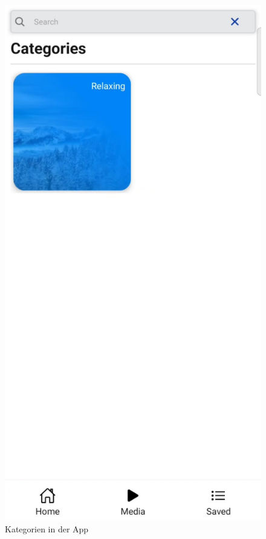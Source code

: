 \begin{figure}[H]
\begin{minipage}{0.5\textwidth}
        \includegraphics[height=2\textwidth]{./pics/Kategorien.jpg}
        \caption{Kategorien in der App}
    \end{minipage}
\end{figure}

